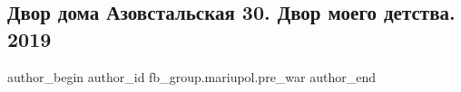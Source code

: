  
 
 
 
 

\subsection{Двор дома Азовстальская 30. Двор моего детства. 2019}
\label{sec:16_02_2023.fb.fb_group.mariupol.pre_war.2.dvor_doma_azovstalsk}

\ifcmt
 author_begin
   author_id fb_group.mariupol.pre_war
 author_end
\fi

